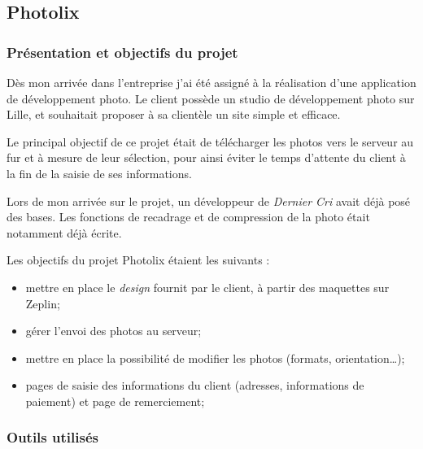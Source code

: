 \documentclass[12pt,a4paper]{article}
\providecommand{\tightlist}{%
  \setlength{\itemsep}{0pt}\setlength{\parskip}{0pt}}
\begin{document}
  \bigskip

  \subsection{Photolix}\label{photolix}

  \subsubsection{Présentation et objectifs du
  projet}\label{pruxe9sentation-et-objectifs-du-projet}

  \bigskip

  Dès mon arrivée dans l'entreprise j'ai été assigné à la réalisation
  d'une application de développement photo. Le client possède un studio de
  développement photo sur Lille, et souhaitait proposer à sa clientèle un
  site simple et efficace.

  \bigskip

  Le principal objectif de ce projet était de télécharger les photos vers
  le serveur au fur et à mesure de leur sélection, pour ainsi éviter le
  temps d'attente du client à la fin de la saisie de ses informations.

  \bigskip

  Lors de mon arrivée sur le projet, un développeur de \emph{Dernier Cri}
  avait déjà posé des bases. Les fonctions de recadrage et de compression
  de la photo était notamment déjà écrite.

  \bigskip

  Les objectifs du projet Photolix étaient les suivants :

  \begin{itemize}
  \tightlist
  \item
    mettre en place le \emph{design} fournit par le client, à partir des
    maquettes sur Zeplin;
  \item
    gérer l'envoi des photos au serveur;
  \item
    mettre en place la possibilité de modifier les photos (formats,
    orientation\ldots{});
  \item
    pages de saisie des informations du client (adresses, informations de
    paiement) et page de remerciement;
  \end{itemize}

  \bigskip

  \subsubsection{Outils utilisés}\label{outils-utilisuxe9s}
\end{document}
